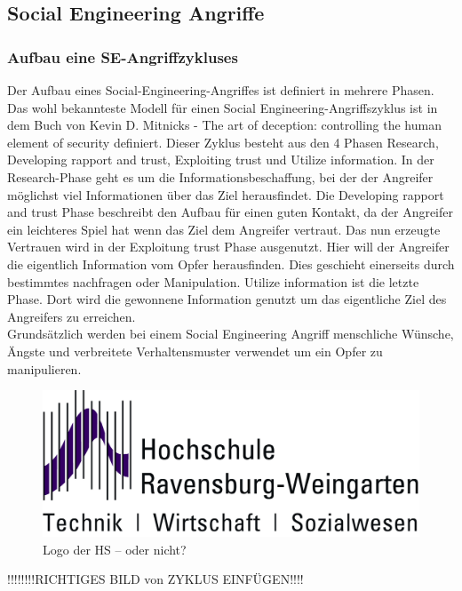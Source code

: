 	\subsection{Social Engineering Angriffe}
		\subsubsection{Aufbau eine SE-Angriffzykluses}
		Der Aufbau eines Social-Engineering-Angriffes ist definiert in mehrere Phasen. Das wohl bekannteste Modell für einen Social Engineering-Angriffszyklus ist in dem Buch von Kevin D. Mitnicks - The art of deception: controlling the human element of security \cite{ArtOfDeception} definiert. Dieser Zyklus besteht aus den 4 Phasen Research, Developing rapport and trust, Exploiting trust und Utilize information.
		In der Research-Phase geht es um die Informationsbeschaffung, bei der der Angreifer möglichst viel Informationen über das Ziel herausfindet. Die Developing rapport and trust Phase beschreibt den Aufbau für einen guten Kontakt, da der Angreifer ein leichteres Spiel hat wenn das Ziel dem Angreifer vertraut. Das nun erzeugte Vertrauen wird in der Exploitung trust Phase ausgenutzt. Hier will der Angreifer die eigentlich Information vom Opfer herausfinden. Dies geschieht einerseits durch bestimmtes nachfragen oder Manipulation. Utilize information ist die letzte Phase. Dort wird die gewonnene Information genutzt um das eigentliche Ziel des Angreifers zu erreichen.\\
		Grundsätzlich werden bei einem Social Engineering Angriff menschliche Wünsche, Ängste und verbreitete Verhaltensmuster verwendet um ein Opfer zu manipulieren.\cite{LeitfadenSE}\\
		\FloatBarrier
		\begin{figure}
			\begin{center}
				\includegraphics*{bilder/HSLogoWGd}
				\caption{Logo der HS -- oder nicht?}
				\label{fig:logo}
			\end{center}
		\end{figure}
		\FloatBarrier 
		!!!!!!!!RICHTIGES BILD von ZYKLUS EINFÜGEN!!!!\\

